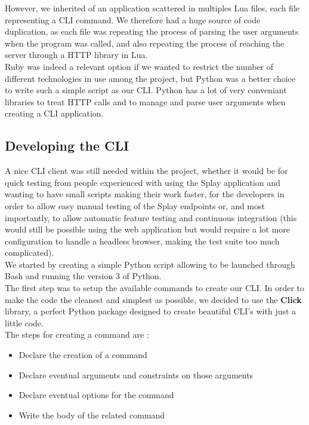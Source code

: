 \documentclass{eplmastersthesis}
\begin{document}
        However, we inherited of an application scattered in multiples Lua
        files, each file representing a CLI command. We therefore had a huge
        source of code duplication, as each file was repeating the process
        of parsing the user arguments when the program was called, and also
        repeating the process of reaching the server through a HTTP library
        in Lua.\\
        Ruby was indeed a relevant option if we wanted to restrict the number
        of different technologies in use among the project, but Python was
        a better choice to write such a simple script as our CLI. Python has
        a lot of very conveniant libraries to treat HTTP calls and to
        manage and parse user arguments when creating a CLI application.

      \subsection{Developing the CLI}

        A nice CLI client was still needed within the project, whether it
        would be for quick testing from people experienced with using the
        Splay application and wanting to have small scripts making their
        work faster, for the developers in order to allow easy manual testing
        of the Splay endpoints or, and most importantly, to allow automatic
        feature testing and continuous integration (this would still be
        possible using the web application but would require a lot more
        configuration to handle a headless browser, making the test suite
        too much complicated).\\

        We started by creating a simple Python script allowing to be launched
        through Bash and running the version 3 of Python.\\

        The first step was to setup the available commands to create our CLI.
        In order to make the code the cleanest and simplest as possible, we
        decided to use the \textbf{Click} \cite{click} library, a perfect
        Python package designed to create beautiful CLI's with just a little
        code.\\
        The steps for creating a command are :

        \begin{itemize}
          \item Declare the creation of a command
          \item Declare eventual arguments and constraints on those arguments
          \item Declare eventual options for the command
          \item Write the body of the related command
        \end{itemize}
\end{document}
